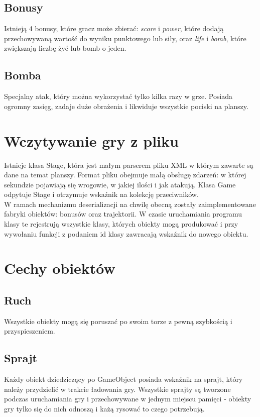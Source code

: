 \documentclass[a4paper,twoside]{article}
\begin{document}
			\subsection{Bonusy}
				Istnieją 4 bonusy, które gracz może zbierać: \textit{score} i \textit{power}, które dodają przechowywaną wartość do wyniku punktowego lub siły, oraz \textit{life} i \textit{bomb}, które zwiększają liczbę żyć lub bomb o jeden.
			\subsection{Bomba}
				Specjalny atak, który można wykorzystać tylko kilka razy w grze. Posiada ogromny zasięg, zadaje duże obrażenia i likwiduje wszystkie pociski na planszy.
				
		\section{Wczytywanie gry z pliku}
			Istnieje klasa Stage, która jest małym parserem pliku XML w którym zawarte są dane na temat planszy. Format pliku obejmuje małą obsługę zdarzeń: w której sekundzie pojawiają się wrogowie, w jakiej ilości i jak atakują. Klasa Game odpytuje Stage i otrzymuje wskaźnik na kolekcję przeciwników.\\
			W ramach mechanizmu deserializacji na chwilę obecną zostały zaimplementowane fabryki obiektów: bonusów oraz trajektorii. W czasie uruchamiania programu klasy te rejestrują wszystkie klasy, których obiekty mogą produkować i przy wywołaniu funkcji z podaniem id klasy zawracają wskaźnik do nowego obiektu.
			
		\section{Cechy obiektów}
			\subsection{Ruch}
				Wszystkie obiekty mogą się poruszać po swoim torze z pewną szybkością i przyspieszeniem.
			\subsection{Sprajt}
				Każdy obiekt dziedziczący po GameObject posiada wskaźnik na sprajt, który należy przydzielić w trakcie ładowania gry. Wszystkie sprajty są tworzone podczas uruchamiania gry i przechowywane  w jednym miejscu pamięci - obiekty gry tylko się do nich odnoszą i każą rysować to czego potrzebują.
		
\end{document}
